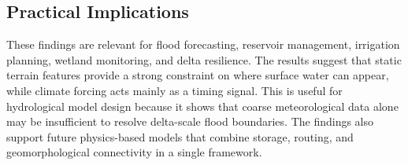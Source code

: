 \subsection{Practical Implications}
These findings are relevant for flood forecasting, reservoir management, irrigation planning, wetland monitoring, and delta resilience. The results suggest that static terrain features provide a strong constraint on where surface water can appear, while climate forcing acts mainly as a timing signal. This is useful for hydrological model design because it shows that coarse meteorological data alone may be insufficient to resolve delta-scale flood boundaries. The findings also support future physics-based models that combine storage, routing, and geomorphological connectivity in a single framework.


